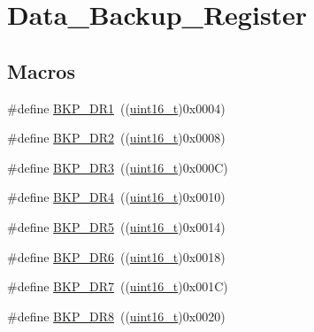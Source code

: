 \hypertarget{group___data___backup___register}{}\section{Data\+\_\+\+Backup\+\_\+\+Register}
\label{group___data___backup___register}
\subsection*{Macros}
\begin{DoxyCompactItemize}
\item 
\#define \hyperlink{group___data___backup___register_ga5d4c3eeaccafcfc0ee3b5dc01381bab0}{B\+K\+P\+\_\+\+D\+R1}~((\hyperlink{_p_e___types_8h_a1f1825b69244eb3ad2c7165ddc99c956}{uint16\+\_\+t})0x0004)
\item 
\#define \hyperlink{group___data___backup___register_ga73867f10a3ef17eeb0d3ace641f185ad}{B\+K\+P\+\_\+\+D\+R2}~((\hyperlink{_p_e___types_8h_a1f1825b69244eb3ad2c7165ddc99c956}{uint16\+\_\+t})0x0008)
\item 
\#define \hyperlink{group___data___backup___register_gadcc77540e016c6e8dffab223af35ae88}{B\+K\+P\+\_\+\+D\+R3}~((\hyperlink{_p_e___types_8h_a1f1825b69244eb3ad2c7165ddc99c956}{uint16\+\_\+t})0x000\+C)
\item 
\#define \hyperlink{group___data___backup___register_gab327f2365ef58f3163f7fe8fa7b3c56e}{B\+K\+P\+\_\+\+D\+R4}~((\hyperlink{_p_e___types_8h_a1f1825b69244eb3ad2c7165ddc99c956}{uint16\+\_\+t})0x0010)
\item 
\#define \hyperlink{group___data___backup___register_ga21191497b79eb37ab00a1564e060e5ca}{B\+K\+P\+\_\+\+D\+R5}~((\hyperlink{_p_e___types_8h_a1f1825b69244eb3ad2c7165ddc99c956}{uint16\+\_\+t})0x0014)
\item 
\#define \hyperlink{group___data___backup___register_ga9d84a78d9c99d57844cfc557f4c047b4}{B\+K\+P\+\_\+\+D\+R6}~((\hyperlink{_p_e___types_8h_a1f1825b69244eb3ad2c7165ddc99c956}{uint16\+\_\+t})0x0018)
\item 
\#define \hyperlink{group___data___backup___register_gaed1b548c12929fbfbc57548ec1316df0}{B\+K\+P\+\_\+\+D\+R7}~((\hyperlink{_p_e___types_8h_a1f1825b69244eb3ad2c7165ddc99c956}{uint16\+\_\+t})0x001\+C)
\item 
\#define \hyperlink{group___data___backup___register_gae6ed231677e748d838f37e7ab89e51ca}{B\+K\+P\+\_\+\+D\+R8}~((\hyperlink{_p_e___types_8h_a1f1825b69244eb3ad2c7165ddc99c956}{uint16\+\_\+t})0x0020)
\item 

\end{DoxyCompactItemize}
